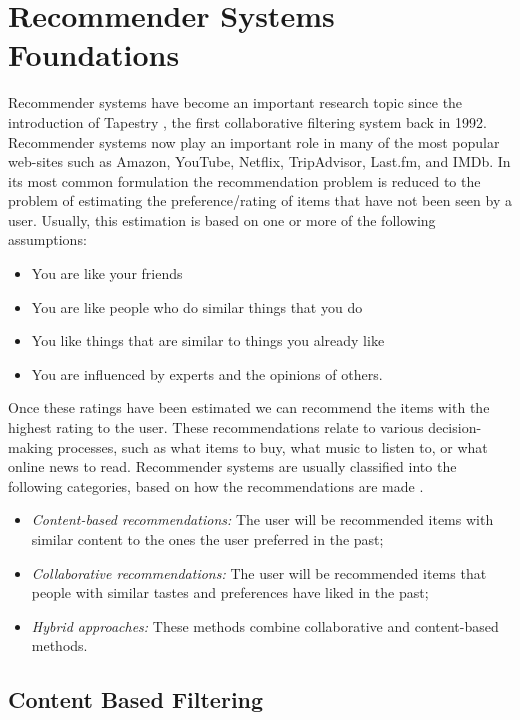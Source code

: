 
\section{Recommender Systems Foundations}
\label{sec:recsys}
Recommender systems have become an important research topic since the
introduction of Tapestry \cite{Goldberg1992}, the first collaborative filtering
system back in 1992. Recommender systems now play an important role in many of
the most popular web-sites such as Amazon, YouTube, Netflix, TripAdvisor,
Last.fm, and IMDb. In its most common formulation the recommendation problem is
reduced to the problem of estimating the preference/rating of items that have
not been seen by a user. Usually, this estimation is based on one or more of
the following assumptions:

\begin{itemize}
\item You are like your friends
\item You are like people who do similar things that you do
\item You like things that are similar to things you already like
\item You are influenced by experts and the opinions of others.
\end{itemize}

Once these ratings have been estimated we can recommend the items with the
highest rating to the user. These recommendations relate to various
decision-making processes, such as what items to buy, what music to listen to,
or what online news to read. Recommender systems are usually classified into
the following categories, based on how the recommendations are made
\cite{Adomavicius2005}.

\begin{itemize}
\item \emph{Content-based recommendations:} The user will be recommended items with similar content to the ones the user preferred in the past;
\item \emph{Collaborative recommendations:} The user will be recommended items that people with similar tastes and preferences have liked in the past;
\item \emph{Hybrid approaches:} These methods combine collaborative and content-based methods.
\end{itemize}

\subsection{Content Based Filtering}

